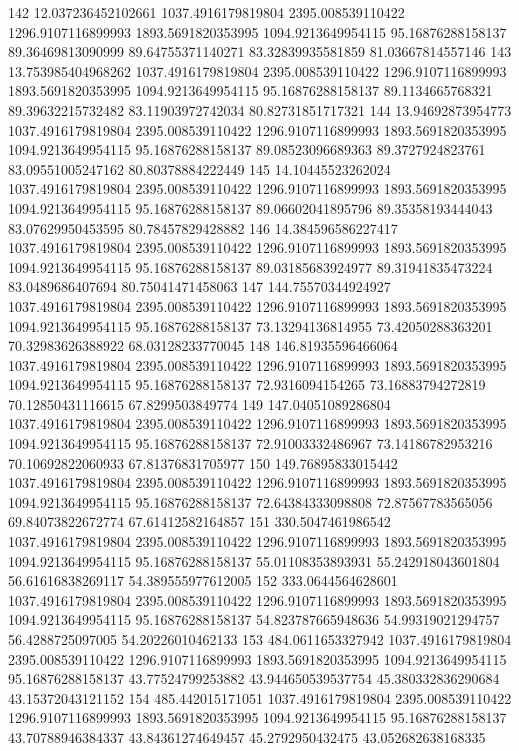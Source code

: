 {142 12.037236452102661 1037.4916179819804 2395.008539110422 1296.9107116899993 1893.5691820353995 1094.9213649954115 95.16876288158137 89.36469813090999 89.64755371140271 83.32839935581859 81.03667814557146
143 13.753985404968262 1037.4916179819804 2395.008539110422 1296.9107116899993 1893.5691820353995 1094.9213649954115 95.16876288158137 89.1134665768321 89.39632215732482 83.11903972742034 80.82731851717321
144 13.94692873954773 1037.4916179819804 2395.008539110422 1296.9107116899993 1893.5691820353995 1094.9213649954115 95.16876288158137 89.08523096689363 89.3727924823761 83.09551005247162 80.80378884222449
145 14.10445523262024 1037.4916179819804 2395.008539110422 1296.9107116899993 1893.5691820353995 1094.9213649954115 95.16876288158137 89.06602041895796 89.35358193444043 83.07629950453595 80.78457829428882
146 14.384596586227417 1037.4916179819804 2395.008539110422 1296.9107116899993 1893.5691820353995 1094.9213649954115 95.16876288158137 89.03185683924977 89.31941835473224 83.0489686407694 80.75041471458063
147 144.75570344924927 1037.4916179819804 2395.008539110422 1296.9107116899993 1893.5691820353995 1094.9213649954115 95.16876288158137 73.13294136814955 73.42050288363201 70.32983626388922 68.03128233770045
148 146.81935596466064 1037.4916179819804 2395.008539110422 1296.9107116899993 1893.5691820353995 1094.9213649954115 95.16876288158137 72.9316094154265 73.16883794272819 70.12850431116615 67.8299503849774
149 147.04051089286804 1037.4916179819804 2395.008539110422 1296.9107116899993 1893.5691820353995 1094.9213649954115 95.16876288158137 72.91003332486967 73.14186782953216 70.10692822060933 67.81376831705977
150 149.76895833015442 1037.4916179819804 2395.008539110422 1296.9107116899993 1893.5691820353995 1094.9213649954115 95.16876288158137 72.64384333098808 72.87567783565056 69.84073822672774 67.61412582164857
151 330.5047461986542 1037.4916179819804 2395.008539110422 1296.9107116899993 1893.5691820353995 1094.9213649954115 95.16876288158137 55.01108353893931 55.242918043601804 56.61616838269117 54.389555977612005
152 333.0644564628601 1037.4916179819804 2395.008539110422 1296.9107116899993 1893.5691820353995 1094.9213649954115 95.16876288158137 54.823787665948636 54.99319021294757 56.4288725097005 54.20226010462133
153 484.0611653327942 1037.4916179819804 2395.008539110422 1296.9107116899993 1893.5691820353995 1094.9213649954115 95.16876288158137 43.77524799253882 43.944650539537754 45.380332836290684 43.15372043121152
154 485.442015171051 1037.4916179819804 2395.008539110422 1296.9107116899993 1893.5691820353995 1094.9213649954115 95.16876288158137 43.70788946384337 43.84361274649457 45.2792950432475 43.052682638168335
}
